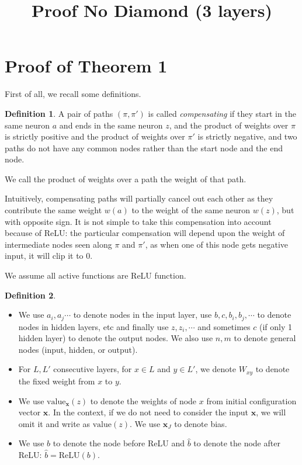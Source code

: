 \documentclass[]{article}
\title{Proof No Diamond (3 layers)}
\date{}
\theoremstyle{definition}
\newtheorem{definition}{Definition}
\newcommand{\ReLU}{\mathrm{ReLU}}
\newcommand{\Val}{\mathrm{value}}
\begin{document}
\section{Proof of Theorem 1}

First of all, we recall some definitions.




\begin{definition}
	A pair of paths $(\pi,\pi')$
	is called {\em compensating} if they start in the same neuron $a$ and 
	ends in the same neuron $z$, and the product of weights over $\pi$ is strictly positive and the product of weights over $\pi'$ is strictly negative, and two paths do not have any common nodes rather than the start node and the end node.
	
	We call the product of weights over a path the weight of that path.
\end{definition}

Intuitively, compensating paths will partially cancel out each other as they contribute the same weight $w(a)$ to the weight of the same neuron $w(z)$, but with opposite sign. 
It is not simple to take this compensation into account because of ReLU: the particular compensation will depend upon the weight of intermediate nodes seen along $\pi$ and $\pi'$, 
as when one of this node gets negative input, it will clip it to 0.


We assume all active functions are ReLU function.

\begin{definition}
	
	\begin{itemize}
		\item  We use $a_i,a_j\cdots$ to denote nodes in the input layer, use $b,c,b_i,b_j,\cdots$ to denote nodes in hidden layers, etc and finally use $z,z_i,\cdots$ and sometimes $c$ (if only 1 hidden layer) to denote the output nodes. We also use $n,m$ to denote general nodes (input, hidden, or output).
		
		
		\item For $L,L'$ consecutive layers, for $x \in L$ and $y \in L'$, we denote 
		$W_{xy}$ to denote the fixed weight from $x$ to $y$. 
		
		\item  We use
		$\Val_{\boldsymbol{x}}(z)$ to denote the weights of node $x$ from initial configuration vector $\boldsymbol{x}$. In the context, if we do not need to consider the input $\boldsymbol{x}$, we will omit it and write as $\Val(z)$.
		We use $\boldsymbol{x}_J$ to denote bias.
		
		\item We use $b$ to denote the node before ReLU and $\hat{b}$ to denote the node after ReLU: $\hat{b} = \ReLU(b)$.
	\end{itemize}
	
\end{definition}
\end{document}
